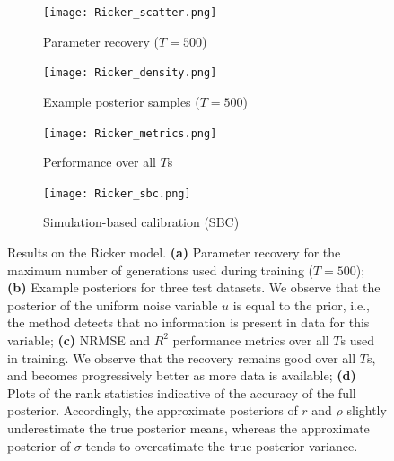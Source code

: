 \documentclass[9pt,twoside,lineno]{pnas-new}
\begin{document}
\begin{figure}[H]
\centering
\begin{subfigure}{.49\textwidth}
    \centering
    \texttt{[image: Ricker\_scatter.png]}
    \caption{Parameter recovery ($T=500$)}
    \label{fig:Fig.4a}
\end{subfigure}
\begin{subfigure}{.49\textwidth}
    \centering
    \texttt{[image: Ricker\_density.png]}
    \caption{Example posterior samples ($T=500$)}
    \label{fig:Fig.4b}
\end{subfigure}
\begin{subfigure}{.49\textwidth}
    \centering
    \texttt{[image: Ricker\_metrics.png]}
    \caption{Performance over all $T$s}
    \label{fig:Fig.4c}
\end{subfigure}
\begin{subfigure}{.49\textwidth}
    \centering
    \texttt{[image: Ricker\_sbc.png]}
    \caption{Simulation-based calibration (SBC)}
    \label{fig:Fig.4d}
\end{subfigure}
\caption[short]{Results on the Ricker model. \textbf{(a)} Parameter recovery for the maximum number of generations used during training ($T=500$); \textbf{(b)} Example posteriors for three test datasets. We observe that the posterior of the uniform noise variable $u$ is equal to the prior, i.e., the method detects that no information is present in data for this variable; \textbf{(c)} NRMSE and $R^{2}$ performance metrics over all $T$s used in training. We observe that the recovery remains good over all $T$s, and becomes progressively better as more data is available; \textbf{(d)} Plots of the rank statistics indicative of the accuracy of the full posterior. Accordingly, the approximate posteriors of $r$ and $\rho$ slightly underestimate the true posterior means, whereas the approximate posterior of $\sigma$ tends to overestimate the true posterior variance.} \label{fig:Fig.4}
\end{figure}
\end{document}
